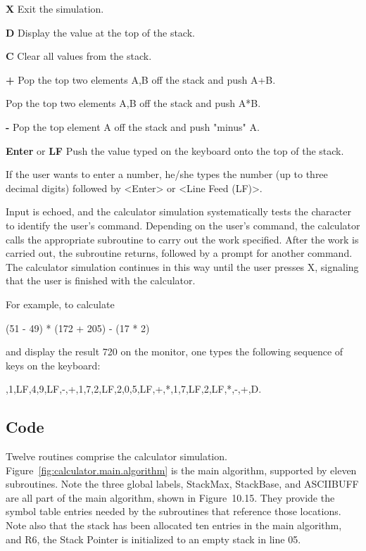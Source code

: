 \documentclass{patt}
\begin{document}
\begin{unlist}
\item{\bf X} Exit the simulation.
\item{\bf D} Display the value at the top of the stack.
\item{\bf C} Clear all values from the stack.
\item{\bf +} Pop the top two elements A,B off the stack and push A+B.
\item{\bf *} Pop the top two elements A,B off the stack and push A*B.
\item{\bf -} Pop the top element A off the stack and push "minus" A.
\item{\bf Enter} or {\bf LF} Push the value typed on the keyboard onto the top
of the stack.
\end{unlist}

If the user wants to enter a number, he/she types the number (up to three
decimal digits) followed by <Enter> or <Line Feed (LF)>.

Input is echoed, and the calculator simulation systematically tests
the character to identify the user's command.  Depending on the
user's command, the calculator calls the appropriate subroutine to carry out
the work specified.  After the work is carried out, the
subroutine returns, followed by a prompt for another command.  The
calculator simulation continues in this way until the user presses X,
signaling that the user is finished with the calculator.

For example, to calculate 

\begin{colorverbatim}
	     (51 - 49) * (172 + 205) - (17 * 2)  
\end{colorverbatim}
\noindent
and display the result 720 on the monitor, one types the following sequence of 
keys on the keyboard:

,1,LF,4,9,LF,-,+,1,7,2,LF,2,0,5,LF,+,*,1,7,LF,2,LF,*,-,+,D.

\subsection{Code}

Twelve routines comprise the calculator
simulation. Figure~\ref{fig:calculator.main.algorithm} is the main
algorithm, supported by eleven subroutines.  Note the three global labels,
StackMax, StackBase, and ASCIIBUFF are all part of the main algorithm,
shown in Figure~10.15.  They provide the symbol table entries needed by
the subroutines that reference those locations.  Note also that the stack
has been allocated ten entries in the main algorithm, and R6, the Stack
Pointer is initialized to an empty stack in line 05.
\end{document}
